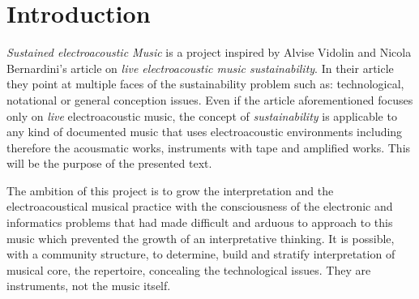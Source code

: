 \documentclass[twoside,a4paper]{article}
\title{\papertitle}
\begin{document}
\maketitle

\begin{abstract}

The electroacoustic musical composition is close to a breaking point: almost one hundred years ago Ottorino Respighi introduced a recorded media into his composition \emph{I Pini di Roma} and even today we don't have a shared consolidate electroacoustic practice to play it. Someone does it better than others, by its own knowledge consciousness equilibrium. It is only a recorded sound to be placed inside an orchestra, not a virtuoso part to be played on a handmade custom electroacoustic instrument disappeared from the earth except for memories, words, and scores. The problem is more serious and deep if consider most of today's electronic-manipulators don't know who Respighi was and what happened after him.

\end{abstract}

\section{Introduction}
\label{sec:intro}

\emph{Sustained electroacoustic Music} is a project inspired by Alvise Vidolin and Nicola Bernardini's article on \emph{live electroacoustic music sustainability}. In their article they point at multiple faces of the sustainability problem such as: technological, notational or general conception issues. Even if the article aforementioned focuses only on \emph{live} electroacoustic music, the concept of \emph{sustainability} is applicable to any kind of documented music that uses electroacoustic environments including therefore the acousmatic works, instruments with tape and amplified works. This will be the purpose of the presented text.

The ambition of this project is to grow the interpretation and the electroacoustical musical practice with the consciousness of the electronic and informatics problems that had made difficult and arduous to approach to this music which prevented the growth of an interpretative thinking. It is possible, with a community structure, to determine, build and stratify interpretation of musical core, the repertoire, concealing the technological issues. They are instruments, not the music itself.
\end{document}

